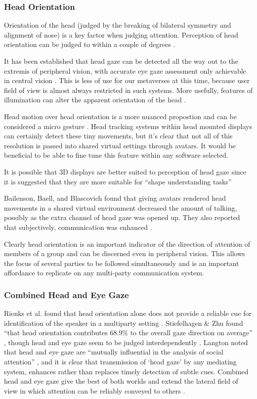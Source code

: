 \subsubsection{Head Orientation}
Orientation of the head (judged by the breaking of bilateral symmetry and alignment of nose) is a key factor when judging attention. Perception of head orientation can be judged to within a couple of degrees \cite{Wilson2000}.\par
It has been established that head gaze can be detected all the way out to the extremis of peripheral vision, with accurate eye gaze assessment only achievable in central vision \cite{Loomis2008}. This is less of use for our metaverses at this time, because user field of view is almost always restricted in such systems. More usefully, features of illumination can alter the apparent orientation of the head \cite{Troje1998}.\par
Head motion over head orientation is a more nuanced propostion and can be considered a micro gesture \cite{Boker2011}. Head tracking systems within head mounted displays can certainly detect these tiny movements, but it's clear that not all of this resolution is passed into shared virtual settings through avatars. It would be beneficial to be able to fine tune this feature within any software selected.\par
                    It is possible that 3D displays are better suited to perception of head gaze since it is suggested that they are more suitable for ``shape understanding tasks'' \cite{St_John2001}\par
                    Bailenson, Baell, and Blascovich found that giving avatars rendered head movements in a shared virtual environment decreased the amount of talking, possibly as the extra channel of head gaze was opened up. They also reported that subjectively, communication was enhanced \cite{Bailenson2002}. \par
                    Clearly head orientation is an important indicator of the direction of attention of members of a group and can be discerned even in peripheral vision. This allows the focus of several parties to be followed simultaneously and is an important affordance to replicate on any multi-party communication system. \par
\subsubsection{Combined Head and Eye Gaze}
Rienks et al. found that head orientation alone does not provide a reliable cue for identification of the speaker in a multiparty setting \cite{Rienks2010}. Stiefelhagen \& Zhu found ``that head orientation contributes 68.9\% to the overall gaze direction on average'' \cite{Stiefelhagen2002}, though head and eye gaze seem to be judged interdependently \cite{Kluttz2009}. Langton noted that head and eye gaze are ``mutually influential in the analysis of social attention'' \cite{Langton2000}, and it is clear that transmission of `head gaze' by any mediating system, enhances rather than replaces timely detection of subtle cues. Combined head and eye gaze give the best of both worlds and extend the lateral field of view in which attention can be reliably conveyed to others \cite{Loomis2008}.
